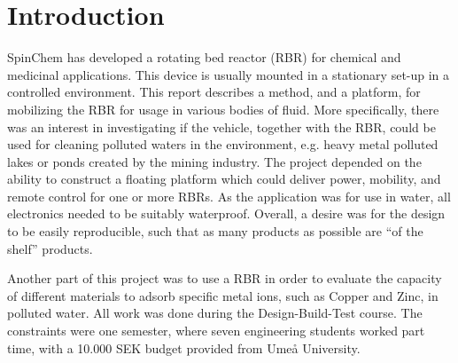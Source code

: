 \section{Introduction}

SpinChem\textsuperscript{\textregistered} has developed a rotating bed reactor (RBR) for chemical and medicinal
applications. This device is usually mounted in a stationary set-up in a
controlled environment. This report describes a method, and a platform, for
mobilizing the RBR for usage in various bodies of fluid. More specifically,
there was an interest in investigating if the vehicle, together with the RBR,
could be used for cleaning polluted waters in the environment, e.g. heavy metal
polluted lakes or ponds created by the mining industry. The project depended on
the ability to construct a floating platform which could deliver power,
mobility, and remote control for one or more RBRs. As the application was for
use in water, all electronics needed to be suitably waterproof. Overall, a
desire was for the design to be easily reproducible, such that as many products as
possible are ``of the shelf'' products.

Another part of this project was to use a RBR in order to evaluate the capacity of
different materials to adsorb specific metal ions, such as Copper and Zinc, in
polluted water. All work was done during the Design-Build-Test course. The constraints were one semester, where seven engineering students worked
part time, with a 10.000 SEK budget provided from Umeå University.
